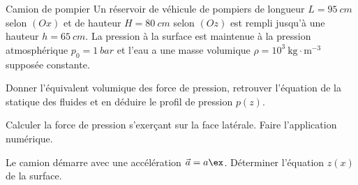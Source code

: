\begin{exo}[PC][1][oral]{Camion de pompier}
Un réservoir de véhicule de pompiers de longueur $L=\SI{95}{cm}$ selon $(Ox)$ et de hauteur $H=\SI{80}{cm}$ selon $(Oz)$ est rempli jusqu'à une hauteur $h=\SI{65}{cm}$. La pression à la surface est maintenue à la pression atmosphérique $p_0=\SI{1}{bar}$ et l'eau a une masse volumique $\rho=10^3 \mathrm{~kg} \cdot \mathrm{m}^{-3}$ supposée constante.
\begin{quest}
\item Donner l'équivalent volumique des force de pression, retrouver l'équation de la statique des fluides et en déduire le profil de pression $p(z)$.
\item Calculer la force de pression s'exerçant sur la face latérale. Faire l'application numérique.
\item Le camion démarre avec une accélération $\vec{a}=a \ex$. Déterminer l'équation $z(x)$ de la surface.
\end{quest}
\end{exo}


